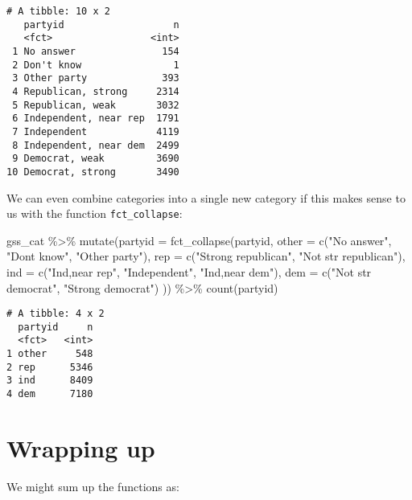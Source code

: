 \documentclass[
]{article}
\newenvironment{Shaded}{\begin{snugshade}}{\end{snugshade}}
\newcommand{\AttributeTok}[1]{\textcolor[rgb]{0.77,0.63,0.00}{#1}}
\newcommand{\FunctionTok}[1]{\textcolor[rgb]{0.00,0.00,0.00}{#1}}
\newcommand{\NormalTok}[1]{#1}
\newcommand{\SpecialCharTok}[1]{\textcolor[rgb]{0.00,0.00,0.00}{#1}}
\newcommand{\StringTok}[1]{\textcolor[rgb]{0.31,0.60,0.02}{#1}}
\begin{document}
\begin{verbatim}
# A tibble: 10 x 2
   partyid                   n
   <fct>                 <int>
 1 No answer               154
 2 Don't know                1
 3 Other party             393
 4 Republican, strong     2314
 5 Republican, weak       3032
 6 Independent, near rep  1791
 7 Independent            4119
 8 Independent, near dem  2499
 9 Democrat, weak         3690
10 Democrat, strong       3490
\end{verbatim}

We can even combine categories into a single new category if this makes
sense to us with the function \texttt{fct\_collapse}:

\begin{Shaded}
\begin{Highlighting}[]
\NormalTok{gss\_cat }\SpecialCharTok{\%\textgreater{}\%}
  \FunctionTok{mutate}\NormalTok{(}\AttributeTok{partyid =} \FunctionTok{fct\_collapse}\NormalTok{(partyid,}
    \AttributeTok{other =} \FunctionTok{c}\NormalTok{(}\StringTok{"No answer"}\NormalTok{, }\StringTok{"Don\textquotesingle{}t know"}\NormalTok{, }\StringTok{"Other party"}\NormalTok{),}
    \AttributeTok{rep =} \FunctionTok{c}\NormalTok{(}\StringTok{"Strong republican"}\NormalTok{, }\StringTok{"Not str republican"}\NormalTok{),}
    \AttributeTok{ind =} \FunctionTok{c}\NormalTok{(}\StringTok{"Ind,near rep"}\NormalTok{, }\StringTok{"Independent"}\NormalTok{, }\StringTok{"Ind,near dem"}\NormalTok{),}
    \AttributeTok{dem =} \FunctionTok{c}\NormalTok{(}\StringTok{"Not str democrat"}\NormalTok{, }\StringTok{"Strong democrat"}\NormalTok{)}
\NormalTok{  )) }\SpecialCharTok{\%\textgreater{}\%}
  \FunctionTok{count}\NormalTok{(partyid)}
\end{Highlighting}
\end{Shaded}

\begin{verbatim}
# A tibble: 4 x 2
  partyid     n
  <fct>   <int>
1 other     548
2 rep      5346
3 ind      8409
4 dem      7180
\end{verbatim}

\hypertarget{wrapping-up}{%
\section{Wrapping up}\label{wrapping-up}}

We might sum up the functions as:
\end{document}
